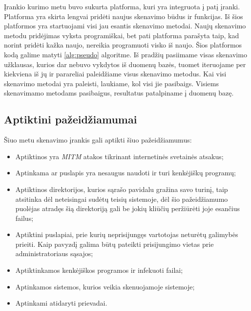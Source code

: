 \documentclass[a4paper,12pt,fleqn]{article}
\begin{document}
Įrankio kurimo metu buvo sukurta platforma, kuri yra integruota į patį įranki. Platforma yra skirta lengvai pridėti naujus skenavimo būdus ir funkcijas. Iš šios platformos yra startuojami visi jau esantis skenavimo metodai. Naujų skenavimo metodu pridėjimas vyksta programiškai, bet pati platforma parašyta taip, kad norint pridėti kažka naujo, nereikia programuoti visko iš naujo. Šios platformos kodą galime matyti \ref{alg:pseudo} algoritme. Iš pradžių pasiimame visas skenavimo užklausas, kurios dar nebuvo vykdytos iš duomenų bazės, tuomet iteruojame per kiekviena iš jų ir parareliai paleidžiame visus skenavimo metodus. Kai visi skenavimo metodai yra paleisti, laukiame, kol visi jie pasibaigs. Visiems skenavimamo metodams pasibaigus, resultatus patalpiname į duomenų bazę.


\subsection{Aptiktini pažeidžiamumai}

Šiuo metu skenavimo įrankis gali aptikti šiuo pažeidžiamumus:
\begin{itemize}
	\item Aptiktinos yra \textit{MITM} atakos tikrinant internetinės svetainės atsakus;
	\item Aptinkama ar puslapis yra nesaugus naudoti ir turi kenkėjiškų programų;
	\item Aptiktinos direktorijos, kurios sąrašo pavidalu gražina savo turinį, taip atsitinka dėl neteisingai sudėtų teisių sistemoje, dėl šio pažeidžiamumo puolėjas atradęs šią direktoriją gali be jokių kliūčių peržiūrėti joje esančius failus;
	\item Aptiktini puslapiai, prie kurių neprisijungęs vartotojas neturėtų galimybės prieiti. Kaip pavyzdį galima būtų pateikti prisijungimo vietas prie administratoriaus sąsajos;
	\item Aptiktinkamos kenkėjiškos programos ir infekuoti failai;
	\item Aptinkamos sistemos, kurios veikia skenuojamoje sistemoje;
	\item Aptinkami atidaryti prievadai.
\end{itemize}
\end{document}
